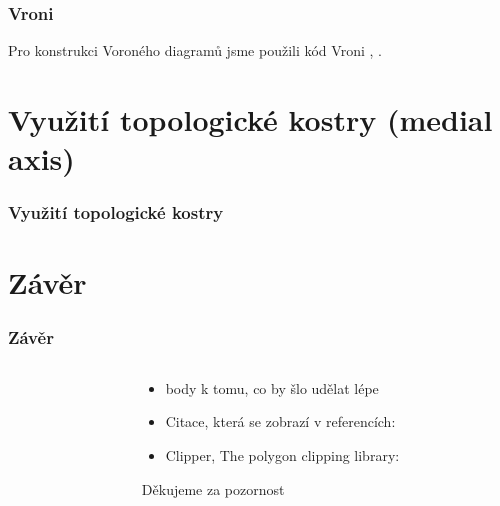 \documentclass[notes=false,pdftex]{beamer}
\begin{document}

\begin{frame}
	\frametitle{Vroni}

	Pro konstrukci Voroného diagramů jsme použili kód Vroni \cite{VroniCode}, \cite{Held200195}.

\end{frame}


\section{Využití topologické kostry (medial axis)}
\begin{frame}
	\frametitle{Využití topologické kostry}

\end{frame}


\section{Závěr}
\begin{frame}
	\frametitle{Závěr}

	\begin{columns}[T]
		\begin{column}{0.5\textwidth}
		\end{column}
		\begin{column}{0.5\textwidth}
			\begin{itemize}
				\item body k tomu, co by šlo udělat lépe\pause
				\item Citace, která se zobrazí v referencích: 
				\item Clipper, The polygon clipping library: \cite{ClipperLib}
			\end{itemize}
			\pause
			\vspace{13ex}\hspace*{\fill}Děkujeme za pozornost
		\end{column}
	\end{columns}

\end{frame}
\end{document}
